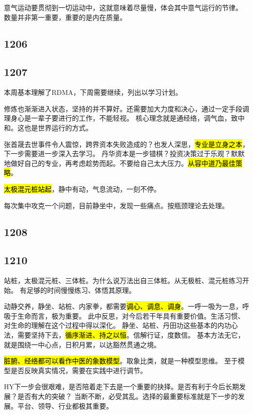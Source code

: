 意气运动要贯彻到一切运动中，这就意味着尽量慢，体会其中意气运行的节律。
数量并非第一重要，重要的是内在质量。

\subsection{1206}

\subsection{1207}

本周基本理解了RDMA，下周需要继续，列出以学习计划。

修炼也渐渐进入状态，坚持的并不算好。还需要加大力度和决心，通过一定手段调理身心是一辈子要进行的工作，不能轻视。
核心理念就是通经络，调气血，致中和。这也是世界运行的方式。

张首晟去世事件令人震惊，跨界资本失败造成的？也发人深思，\hl{专业是立身之本}，下一步需要进一步深入去学习。
丹华资本是一步错棋？投资决策过于乐观？默默地做好自己的专业，再考虑趁势而起。不要给自己太大压力。\hl{从容中道乃最佳策略}。

\hl{太极混元桩站起}，静中有动，气息流动，一刻不停。

每次集中攻克一个问题，目前静坐中，发现一些痛点。按瓶颈理论去处理。

\subsection{1208}

\subsection{1210}

站桩，太极混元桩、三体桩。为什么说万法出自三体桩。从无极桩、混元桩练习开始。
有足够的时间慢慢练习、体悟其原理。

动静交养，静坐、站桩、内家拳，都需要\hl{调心、调息、调身}。一呼一吸为一息，呼吸于生命而言，极为重要。
此中反思，对今后若干年具有重要价值。生活习惯、对生命的理解在这个过程中得以深化。
静坐、站桩、丹田功这些基本的内功心法，需要坚持下去，\hl{循序渐进、持之以恒}。信解行证，度数信。
基本方法无它，就是围绕一中心点，日积月累，以达豁然贯通之境。

\hl{脏腑、经络都可以看作中医的象数模型}。取象比类，就是一种模型思维。
至于模型是否反映真实情况，需要在实践中进行调节。

HY下一步会很艰难，是否陪着走下去是一个重要的抉择。是否有利于今后长期发展？是否有大的突破？
当断不断，必受其乱。选择的最重要标准就是下一步的发展。平台、领导、行业都极其重要。


